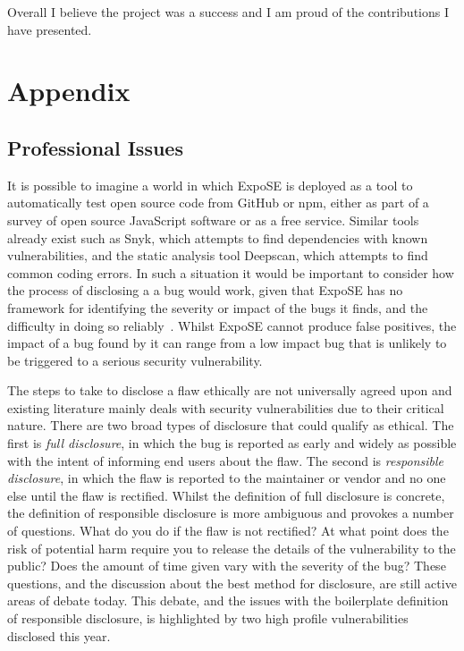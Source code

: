 \documentclass[]{final_report}
\begin{document}
Overall I believe the project was a success and I am proud of the contributions I have presented.

\newpage


\label{endpage}

\newpage

\chapter{Appendix}

\section{Professional Issues}
It is possible to imagine a world in which ExpoSE is deployed as a tool to automatically test open source code from GitHub or npm, either as part of a survey of open source JavaScript software or as a free service. Similar tools already exist such as Snyk, which attempts to find dependencies with known vulnerabilities, and the static analysis tool Deepscan, which attempts to find common coding errors. In such a situation it would be important to consider how the process of disclosing a a bug would work, given that ExpoSE has no framework for identifying the severity or impact of the bugs it finds, and the difficulty in doing so reliably~\cite{lamkanfi2010predicting}. Whilst ExpoSE cannot produce false positives, the impact of a bug found by it can range from a low impact bug that is unlikely to be triggered to a serious security vulnerability. 

The steps to take to disclose a flaw ethically are not universally agreed upon and existing literature mainly deals with security vulnerabilities due to their critical nature. There are two broad types of disclosure that could qualify as ethical. The first is \textit{full disclosure}, in which the bug is reported as early and widely as possible with the intent of informing end users about the flaw. The second is \textit{responsible disclosure}, in which the flaw is reported to the maintainer or vendor and no one else until the flaw is rectified. Whilst the definition of full disclosure is concrete, the definition of responsible disclosure is more ambiguous and provokes a number of questions. What do you do if the flaw is not rectified? At what point does the risk of potential harm require you to release the details of the vulnerability to the public? Does the amount of time given vary with the severity of the bug? These questions, and the discussion about the best method for disclosure, are still active areas of debate today. This debate, and the issues with the boilerplate definition of responsible disclosure, is highlighted by two high profile vulnerabilities disclosed this year. 
\end{document}
